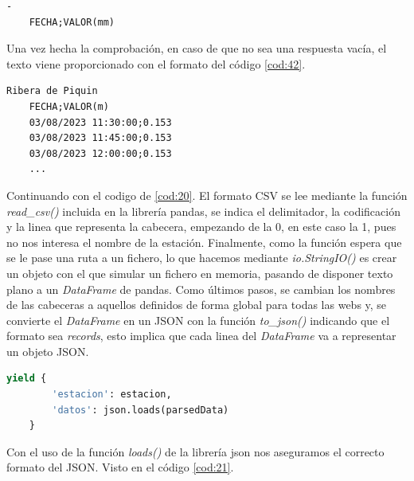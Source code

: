 \begin{lstlisting}[caption={Respuesta recibida en caso de que la web pedida no exista}, label=cod:41]
	-
	FECHA;VALOR(mm)
\end{lstlisting}

Una vez hecha la comprobación, en caso de que no sea una respuesta vacía, el texto viene proporcionado con el formato del código \ref{cod:42}.

\begin{lstlisting}[caption={Respuesta recibida en caso de que la web pedida exista}, label=cod:42]
	Ribera de Piquin
	FECHA;VALOR(m)
	03/08/2023 11:30:00;0.153
	03/08/2023 11:45:00;0.153
	03/08/2023 12:00:00;0.153
	...
\end{lstlisting}

Continuando con el codigo de \ref{cod:20}. El formato CSV se lee mediante la función \textit{read\_csv()} incluida en la librería pandas, se indica el delimitador, la codificación y la linea que representa la cabecera, empezando de la 0, en este caso la 1, pues no nos interesa el nombre de la estación. Finalmente, como la función espera que se le pase una ruta a un fichero, lo que hacemos mediante \textit{io.StringIO()} es crear un objeto con el que simular un fichero en memoria, pasando de disponer texto plano a un \textit{DataFrame} de pandas.\newline
\newline
Como últimos pasos, se cambian los nombres de las cabeceras a aquellos definidos de forma global para todas las webs y, se convierte el \textit{DataFrame} en un JSON con la función \textit{to\_json()} indicando que el formato sea \textit{records}, esto implica que cada linea del \textit{DataFrame} va a representar un objeto JSON.

\begin{lstlisting}[language=Python, caption={Guardado de datos de CHCantábrico Nivel Spider}, label=cod:21]
	yield {
		'estacion': estacion,
		'datos': json.loads(parsedData)
	}
\end{lstlisting}

Con el uso de la función \textit{loads()} de la librería json nos aseguramos el correcto formato del JSON. Visto en el código \ref{cod:21}.

